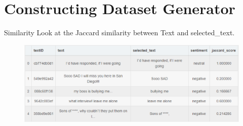\documentclass[
 size=14pt,
 paper=smartboard,  %
 mode=present, 		%
 display=slides, 	%
 style=tuliplab,  	%
 pauseslide,
 fleqn,leqno]{powerdot}
\begin{document}

\section{Constructing Dataset Generator}

\begin{slide}{Similarity}
  Look at the Jaccard similarity between Text and selected_text.
  \bigskip
  \begin{figure}
    \centering
    \includegraphics[width=1\textwidth]{kaggle/1.8.eps}
  \end{figure}
\end{slide}
\end{document}
